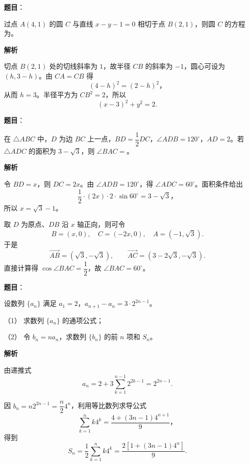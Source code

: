 \begin{answer}

\textbf{题目}：

过点 $A(4,1)$ 的圆 $C$ 与直线 $x-y-1=0$ 相切于点 $B(2,1)$，则圆 $C$ 的方程为\gkblank{}。

\textbf{解析}

切点 $B(2,1)$ 处的切线斜率为 $1$，故半径 $CB$ 的斜率为 $-1$，圆心可设为
$(h,3-h)$。由 $CA=CB$ 得
\nopagebreak[4]
\[
(4-h)^2=(2-h)^2\text{，}
\]
从而 $h=3$。半径平方为 $CB^2=2$，所以
\nopagebreak[4]
\[
(x-3)^2+y^2=2.
\]


\end{answer}
\begin{answer}

\textbf{题目}：

在 $\triangle ABC$ 中，$D$ 为边 $BC$ 上一点，$BD=\dfrac12DC$，$\angle ADB=120^\circ$，$AD=2$。若 $\triangle ADC$ 的面积为 $3-\sqrt3$，则 $\angle BAC=$\gkblank{}。

\textbf{解析}

令 $BD=x$，则 $DC=2x$。由 $\angle ADB=120^\circ$，得 $\angle ADC=60^\circ$。面积条件给出
\nopagebreak[4]
\[
\frac12\cdot (2x)\cdot2\cdot\sin60^\circ=3-\sqrt3\text{，}
\]
所以 $x=\sqrt3-1$。

取 $D$ 为原点、$DB$ 沿 $x$ 轴正向，则可令
\nopagebreak[4]
\[
B=(x,0),\quad C=(-2x,0),\quad A=(-1,\sqrt3).
\]
于是
\nopagebreak[4]
\[
\overrightarrow{AB}=(\sqrt3,-\sqrt3),\qquad
\overrightarrow{AC}=(3-2\sqrt3,-\sqrt3).
\]
直接计算得 $\cos\angle BAC=\dfrac12$，故 $\angle BAC=60^\circ$。


\end{answer}
\begin{answer}

\textbf{题目}：

设数列 $\{a_n\}$ 满足 $a_1=2$，$a_{n+1}-a_n=3\cdot2^{2n-1}$。

（1） 求数列 $\{a_n\}$ 的通项公式；

（2） 令 $b_n=na_n$，求数列 $\{b_n\}$ 的前 $n$ 项和 $S_n$。

\textbf{解析}


由递推式
\nopagebreak[4]
\[
a_n=2+3\sum_{k=1}^{n-1}2^{2k-1}=2^{2n-1}.
\]


因 $b_n=n2^{2n-1}=\dfrac n2 4^n$，利用等比数列求导公式
\nopagebreak[4]
\[
\sum_{k=1}^n k4^k=\frac{4+(3n-1)4^{n+1}}9\text{，}
\]
得到
\nopagebreak[4]
\[
S_n=\frac12\sum_{k=1}^n k4^k
=\frac{2\left[1+(3n-1)4^n\right]}9.
\]



\end{answer}
